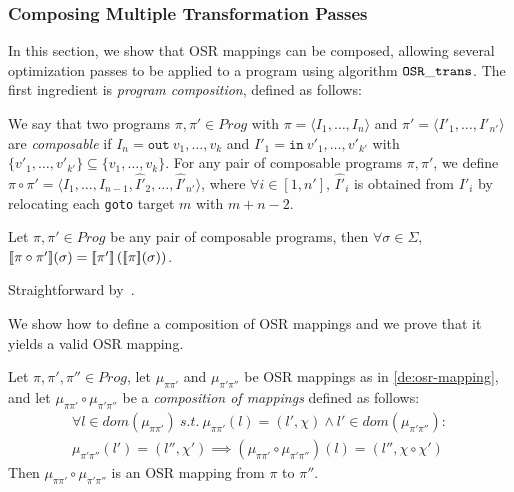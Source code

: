 
\subsubsection{Composing Multiple Transformation Passes}
\label{ss:trans-compose}

In this section, we show that OSR mappings can be composed, allowing several optimization passes to be applied to a program using algorithm ${\tt OSR\_trans}$. The first ingredient is {\em program composition}, defined as follows:

\begin{definition}
\label{de:composition}
We say that two programs $\pi,\pi'\in Prog$ with $\pi=\langle I_1,\ldots,I_n\rangle$ and $\pi'=\langle I'_1,\ldots,I'_{n'}\rangle$ are {\em composable} if $I_n=\texttt{out}~v_1,\ldots,v_k$ and $I'_1=\texttt{in}~v'_1,\ldots,v'_{k'}$ with $\{v'_1,\ldots,v'_{k'}\}\subseteq\{v_1,\ldots,v_k\}$. For any pair of composable programs $\pi,\pi'$, we define $\pi\circ\pi'=\langle I_1,\ldots,I_{n-1},\hat{I'}_2,\ldots,\hat{I'}_{n'}\rangle$, where $\forall i\in[1,n']$, $\hat{I'}_i$ is obtained from $I'_i$ by relocating each {\tt goto} target $m$ with $m+n-2$.
\iffalse
where $\chi\circ\chi'=\chi\setminus\{{\tt out \ldots}\}\cdot\chi'\left[
\begin{tiny}
\begin{array}{l}
\texttt{goto}~m\mapsto \\
\texttt{goto}~m+|\chi|-2
\end{array}
\end{tiny}
\right]\setminus\{{\tt in \ldots}\}$. 
\fi
\end{definition}

\begin{lemma}
\label{le:prog-comp-sem}
Let $\pi,\pi'\in Prog$ be any pair of composable programs, then $\forall\sigma\in\Sigma,$ $[\![\pi\circ\pi']\!](\sigma)=[\![\pi']\!]\left([\![\pi]\!](\sigma)\right)$.
\end{lemma}
\begin{myproof}
Straightforward by~.
\end{myproof}

\noindent We show how to define a composition of OSR mappings and we prove that it yields a valid OSR mapping.

\begin{lemma}
\label{le:osr-mapping-comp}
Let $\pi,\pi',\pi''\in Prog$, let $\mu_{\pi\pi'}$ and $\mu_{\pi'\pi''}$ be OSR mappings as in \mydefinition\ref{de:osr-mapping}, and let $\mu_{\pi\pi'}\circ\mu_{\pi'\pi''}$ be a {\em composition of mappings} defined as follows:
\begin{gather*}
\forall l\in dom(\mu_{\pi\pi'})~s.t.~\mu_{\pi\pi'}(l)=(l',\chi)\wedge l'\in dom(\mu_{\pi'\pi''}):\\
\mu_{\pi'\pi''}(l')=(l'',\chi')\implies(\mu_{\pi\pi'}\circ\mu_{\pi'\pi''})(l)=(l'',\chi\circ\chi')
\end{gather*}
Then $\mu_{\pi\pi'}\circ\mu_{\pi'\pi''}$ is an OSR mapping from $\pi$ to $\pi''$.
\end{lemma}


